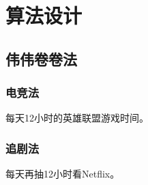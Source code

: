 \section{算法设计}\label{algorithm}

\subsection{伟伟卷卷法}

\subsubsection{电竞法}

每天12小时的英雄联盟游戏时间。

\subsubsection{追剧法}

每天再抽12小时看Netflix。
